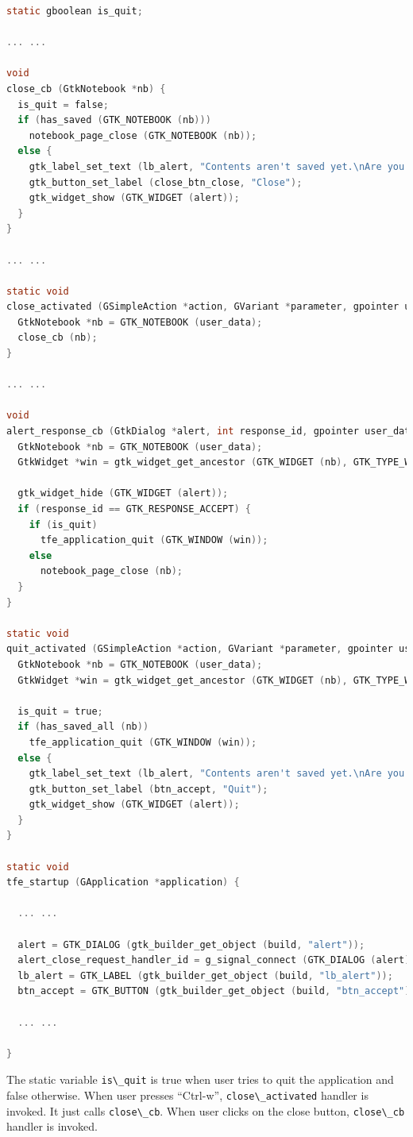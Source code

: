 \begin{lstlisting}[language=C]
static gboolean is_quit;

... ...

void
close_cb (GtkNotebook *nb) {
  is_quit = false;
  if (has_saved (GTK_NOTEBOOK (nb)))
    notebook_page_close (GTK_NOTEBOOK (nb));
  else {
    gtk_label_set_text (lb_alert, "Contents aren't saved yet.\nAre you sure to close?");
    gtk_button_set_label (close_btn_close, "Close");
    gtk_widget_show (GTK_WIDGET (alert));
  }
}

... ...

static void
close_activated (GSimpleAction *action, GVariant *parameter, gpointer user_data) {
  GtkNotebook *nb = GTK_NOTEBOOK (user_data);
  close_cb (nb);
}

... ...

void
alert_response_cb (GtkDialog *alert, int response_id, gpointer user_data) {
  GtkNotebook *nb = GTK_NOTEBOOK (user_data);
  GtkWidget *win = gtk_widget_get_ancestor (GTK_WIDGET (nb), GTK_TYPE_WINDOW);

  gtk_widget_hide (GTK_WIDGET (alert));
  if (response_id == GTK_RESPONSE_ACCEPT) {
    if (is_quit)
      tfe_application_quit (GTK_WINDOW (win));
    else
      notebook_page_close (nb);
  }
}

static void
quit_activated (GSimpleAction *action, GVariant *parameter, gpointer user_data) {
  GtkNotebook *nb = GTK_NOTEBOOK (user_data);
  GtkWidget *win = gtk_widget_get_ancestor (GTK_WIDGET (nb), GTK_TYPE_WINDOW);

  is_quit = true;
  if (has_saved_all (nb))
    tfe_application_quit (GTK_WINDOW (win));
  else {
    gtk_label_set_text (lb_alert, "Contents aren't saved yet.\nAre you sure to quit?");
    gtk_button_set_label (btn_accept, "Quit");
    gtk_widget_show (GTK_WIDGET (alert));
  }
}

static void
tfe_startup (GApplication *application) {

  ... ...

  alert = GTK_DIALOG (gtk_builder_get_object (build, "alert"));
  alert_close_request_handler_id = g_signal_connect (GTK_DIALOG (alert), "close-request", G_CALLBACK (dialog_close_cb), NULL);
  lb_alert = GTK_LABEL (gtk_builder_get_object (build, "lb_alert"));
  btn_accept = GTK_BUTTON (gtk_builder_get_object (build, "btn_accept"));

  ... ...

}
\end{lstlisting}

The static variable \passthrough{\lstinline!is\_quit!} is true when user
tries to quit the application and false otherwise. When user presses
``Ctrl-w'', \passthrough{\lstinline!close\_activated!} handler is
invoked. It just calls \passthrough{\lstinline!close\_cb!}. When user
clicks on the close button, \passthrough{\lstinline!close\_cb!} handler
is invoked.

